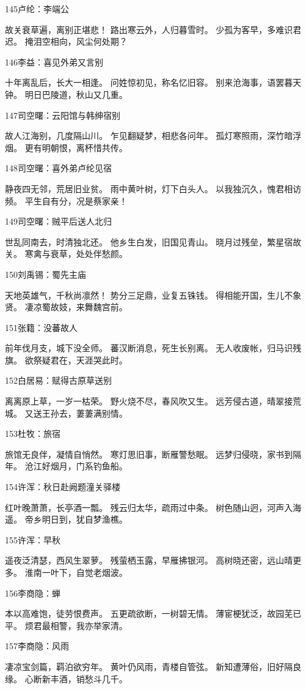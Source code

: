 145卢纶：李端公

故关衰草遍，离别正堪悲！
路出寒云外，人归暮雪时。
少孤为客早，多难识君迟。
掩泪空相向，风尘何处期？

146李益：喜见外弟又言别

十年离乱后，长大一相逢。
问姓惊初见，称名忆旧容。
别来沧海事，语罢暮天钟。
明日巴陵道，秋山又几重。

147司空曙：云阳馆与韩绅宿别

故人江海别，几度隔山川。
乍见翻疑梦，相悲各问年。
孤灯寒照雨，深竹暗浮烟。
更有明朝恨，离杯惜共传。

148司空曙：喜外弟卢纶见宿

静夜四无邻，荒居旧业贫。
雨中黄叶树，灯下白头人。
以我独沉久，愧君相访频。
平生自有分，况是蔡家亲！

149司空曙：贼平后送人北归

世乱同南去，时清独北还。
他乡生白发，旧国见青山。
晓月过残垒，繁星宿故关。
寒禽与衰草，处处伴愁颜。

150刘禹锡：蜀先主庙

天地英雄气，千秋尚凛然！
势分三足鼎，业复五铢钱。
得相能开国，生儿不象贤。
凄凉蜀故妓，来舞魏宫前。

151张籍：没蕃故人

前年伐月支，城下没全师。
蕃汉断消息，死生长别离。
无人收废帐，归马识残旗。
欲祭疑君在，天涯哭此时。

152白居易：赋得古原草送别

离离原上草，一岁一枯荣。
野火烧不尽，春风吹又生。
远芳侵古道，晴翠接荒城。
又送王孙去，萋萋满别情。

153杜牧：旅宿

旅馆无良伴，凝情自悄然。
寒灯思旧事，断雁警愁眠。
远梦归侵晓，家书到隔年。
沧江好烟月，门系钓鱼船。

154许浑：秋日赴阙题潼关驿楼

红叶晚萧萧，长亭酒一瓢。
残云归太华，疏雨过中条。
树色随山迥，河声入海遥。
帝乡明日到，犹自梦渔樵。

155许浑：早秋

遥夜泛清瑟，西风生翠萝。
残萤栖玉露，早雁拂银河。
高树晓还密，远山晴更多。
淮南一叶下，自觉老烟波。

156李商隐：蝉

本以高难饱，徒劳恨费声。
五更疏欲断，一树碧无情。
薄宦梗犹泛，故园芜已平。
烦君最相警，我亦举家清。

157李商隐：风雨

凄凉宝剑篇，羁泊欲穷年。
黄叶仍风雨，青楼自管弦。
新知遭薄俗，旧好隔良缘。
心断新丰酒，销愁斗几千。

